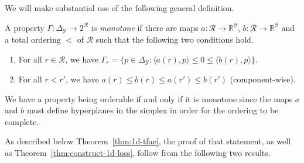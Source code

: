 \documentclass[final]{colt2020} %
\newcommand{\reals}{\mathbb{R}}
\newcommand{\simplex}{\Delta_\Y}
\newcommand{\R}{\mathcal{R}}
\newcommand{\Y}{\mathcal{Y}}
\newcommand{\inprod}[2]{\langle #1, #2 \rangle}%
\begin{document}
We will make substantial use of the following general definition.
\begin{definition}\label{def:monotone-prop}
  A property $\Gamma:\simplex\to 2^\R$ is \emph{monotone} if there are maps $a:\R\to\reals^\Y$, $b:\R\to\reals^\Y$ and a total ordering $<$ of $\R$ such that the following two conditions hold.
  \begin{enumerate}
  \item For all $r\in\R$, we have $\Gamma_r = \{p\in\simplex : \inprod{a(r)}{p} \leq 0 \leq \inprod{b(r)}{p} \}$.
  \item For all $r < r'$, we have $a(r) \leq b(r) \leq a(r') \leq b(r')$ (component-wise).
  \end{enumerate}
\end{definition}

We have a property being orderable if and only if it is monotone since the maps $a$ and $b$ must define hyperplanes in the simplex in order for the ordering to be complete.


As described below Theorem~\ref{thm:1d-tfae}, the proof of that statement, as well as Theorem~\ref{thm:construct-1d-loss}, follow from the following two results.
\end{document}
